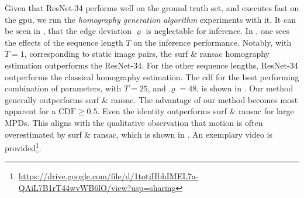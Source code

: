 Given that ResNet-34 performs well on the ground truth set, and executes fast on the \gls{gpu}, we run the \textit{homography generation algorithm} experiments with it. It can be seen in , that the edge deviation $\varrho$ is neglectable for inference. In , one sees the effects of the sequence length $T$ on the inference performance. Notably, with $T=1$, corresponding to static image pairs, the \gls{surf} \& \gls{ransac} homography estimation outperforms the ResNet-34. For the other sequence lengths, ResNet-34 outperforms the classical homography estimation. The \gls{cdf} for the best performing combination of parameters, with $T=25$, and $\varrho=48$, is shown in . Our method generally outperforms \gls{surf} \& \gls{ransac}. The advantage of our method becomes most apparent for a $\text{CDF}\geq0.5$. Even the identity outperforms \gls{surf} \& \gls{ransac} for large MPDs. This aligns with the qualitative observation that motion is often overestimated by \gls{surf} \& \gls{ransac}, which is shown in . An exemplary video is provided\footnote{\url{https://drive.google.com/file/d/1totjHbhIMEL7a-QAiL7B1rT44wvWB6lO/view?usp=sharing}}.






